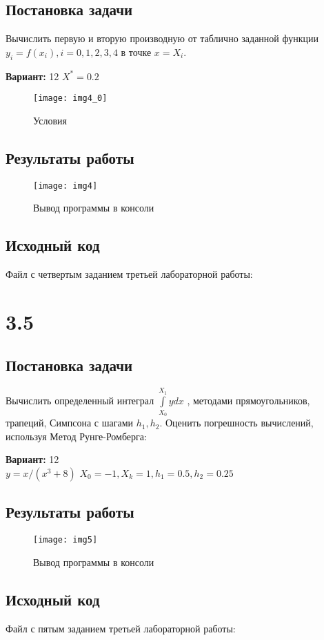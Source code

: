 \subsection{Постановка задачи}
Вычислить первую и вторую производную от таблично заданной функции $y_i=f(x_i), i=0,1,2,3,4$  в точке $x=X_i$.   

{\bfseries Вариант:} 12
$X^*=0.2$

\begin{figure}[h!]
\centering
\texttt{[image: img4\_0]}
\caption{Условия}
\end{figure}

\subsection{Результаты работы}
\begin{figure}[h!]
\centering
\texttt{[image: img4]}
\caption{Вывод программы в консоли}
\end{figure}
\pagebreak

\subsection{Исходный код}
Файл с четвертым заданием третьей лабораторной работы:

\pagebreak
\section* {3.5}

\subsection{Постановка задачи}
Вычислить определенный интеграл $\int\limits_{X_0}^{X_1} y dx$  , методами прямоугольников, трапеций, Симпсона с шагами $h_1,h_2$. Оценить погрешность вычислений, используя  Метод Рунге-Ромберга: 

{\bfseries Вариант:} 12\\
$y= x/(x^3+8)$
$X_0=-1, X_k=1, h_1=0.5, h_2=0.25$

\subsection{Результаты работы}
\begin{figure}[h!]
\centering
\texttt{[image: img5]}
\caption{Вывод программы в консоли}
\end{figure}
\pagebreak

\subsection{Исходный код}
Файл с пятым заданием третьей лабораторной работы:
